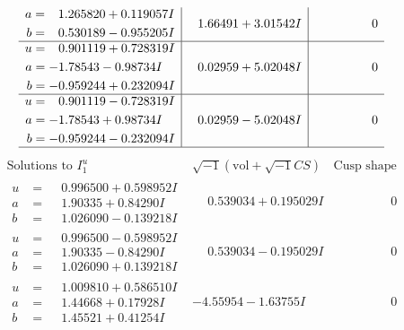 \documentclass[1p]{elsarticle_modified}
\theoremstyle{definition}
\newcommand{\I}{\sqrt{-1}}
\begin{document}
$$\begin{array}{c|c|c}
\begin{aligned}
a &= \phantom{-}1.265820 + 0.119057 I \\
b &= \phantom{-}0.530189 - 0.955205 I\end{aligned}
 & \phantom{-}1.66491 + 3.01542 I & \phantom{-0.000000 } 0 \\ \hline\begin{aligned}
u &= \phantom{-}0.901119 + 0.728319 I \\
a &= -1.78543 - 0.98734 I \\
b &= -0.959244 + 0.232094 I\end{aligned}
 & \phantom{-}0.02959 + 5.02048 I & \phantom{-0.000000 } 0 \\ \hline\begin{aligned}
u &= \phantom{-}0.901119 - 0.728319 I \\
a &= -1.78543 + 0.98734 I \\
b &= -0.959244 - 0.232094 I\end{aligned}
 & \phantom{-}0.02959 - 5.02048 I & \phantom{-0.000000 } 0\\
 \hline 
 \end{array}$$\newpage$$\begin{array}{c|c|c}  
\text{Solutions to }I^u_{1}& \I (\text{vol} + \sqrt{-1}CS) & \text{Cusp shape}\\
 \hline 
\begin{aligned}
u &= \phantom{-}0.996500 + 0.598952 I \\
a &= \phantom{-}1.90335 + 0.84290 I \\
b &= \phantom{-}1.026090 - 0.139218 I\end{aligned}
 & \phantom{-}0.539034 + 0.195029 I & \phantom{-0.000000 } 0 \\ \hline\begin{aligned}
u &= \phantom{-}0.996500 - 0.598952 I \\
a &= \phantom{-}1.90335 - 0.84290 I \\
b &= \phantom{-}1.026090 + 0.139218 I\end{aligned}
 & \phantom{-}0.539034 - 0.195029 I & \phantom{-0.000000 } 0 \\ \hline\begin{aligned}
u &= \phantom{-}1.009810 + 0.586510 I \\
a &= \phantom{-}1.44668 + 0.17928 I \\
b &= \phantom{-}1.45521 + 0.41254 I\end{aligned}
 & -4.55954 - 1.63755 I & \phantom{-0.000000 } 0 \\ \hline\begin{aligned}

\end{aligned}
\end{array}$$
\end{document}
